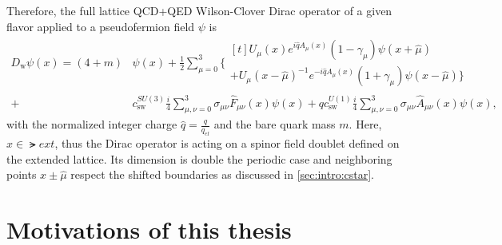 Therefore, the full lattice QCD+QED Wilson-Clover Dirac operator of a given flavor applied to a pseudofermion field $\psi$ is
\begin{equation}
\begin{aligned} \label{eq:Dw:QCD+QED}
D_\mathrm{w} \psi(x) = \left( 4 + m \right) &\psi(x) + \frac{1}{2} \sum_{\mu=0}^3
\Big\{
  \begin{multlined}[t]
    U_{\mu}(x)e^{i \hat{q} A_{\mu}(x)} (1-\gamma_{\mu}) \psi(x + \hat{\mu}) \\
   +U_{\mu}(x-\hat{\mu})^{-1}e^{-i \hat{q} A_{\mu}(x) } (1+\gamma_{\mu}) \psi(x-\hat{\mu})
\Big\} \end{multlined} \\
+&c_\mathrm{sw}^{SU(3)} \frac{i}{4} \sum_{\mu,\nu=0}^3 \sigma_{\mu \nu} \hat{F}_{\mu \nu}(x) \psi(x)
+q c_\mathrm{sw}^{U(1)} \frac{i}{4} \sum_{\mu,\nu=0}^3 \sigma_{\mu \nu} \hat{A}_{\mu \nu}(x) \psi(x),
\end{aligned}
\end{equation}
with the normalized integer charge $\hat{q} = \frac{q}{q_{el}}$ and the bare quark mass $m$.
Here, $x \in \lat{ext}$, thus the Dirac operator is acting on a spinor field doublet defined on the extended lattice.
Its dimension is double the periodic case and neighboring points $x \pm \hat{\mu}$ respect the shifted boundaries as discussed in \cref{sec:intro:cstar}.




























\section{Motivations of this thesis}
\label{sec:intro:motivation}


